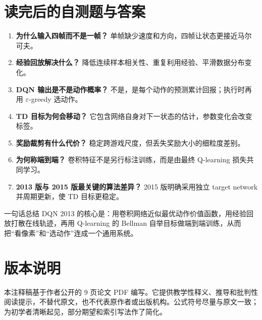 \documentclass[UTF8,11pt]{ctexart}
\begin{document}
\section{读完后的自测题与答案}
\begin{enumerate}
\item \textbf{为什么输入四帧而不是一帧？} 单帧缺少速度和方向，四帧让状态更接近马尔可夫。
\item \textbf{经验回放解决什么？} 降低连续样本相关性、重复利用经验、平滑数据分布变化。
\item \textbf{DQN 输出是不是动作概率？} 不是，是每个动作的预测累计回报；执行时再用 $\varepsilon$-greedy 选动作。
\item \textbf{TD 目标为何会移动？} 它包含网络自身对下一状态的估计，参数变化会改变标签。
\item \textbf{奖励裁剪有什么代价？} 稳定跨游戏尺度，但丢失奖励大小的细粒度差别。
\item \textbf{为何称端到端？} 卷积特征不是另行标注训练，而是由最终 Q-learning 损失共同学习。
\item \textbf{2013 版与 2015 版最关键的算法差异？} 2015 版明确采用独立 target network 并周期更新，使 TD 目标更稳定。
\end{enumerate}

\begin{keybox}{一句话总结}
DQN 2013 的核心是：用卷积网络近似最优动作价值函数，用经验回放打散在线轨迹，再用 Q-learning 的 Bellman 自举目标做端到端训练，从而把“看像素”和“选动作”连成一个通用系统。
\end{keybox}

\section*{版本说明}
本注释稿基于作者公开的 9 页论文 PDF 编写。它提供教学性释义、推导和批判性阅读提示，不替代原文，也不代表原作者或出版机构。公式符号尽量与原文一致；为初学者清晰起见，部分期望和索引写法作了简化。
\end{document}
